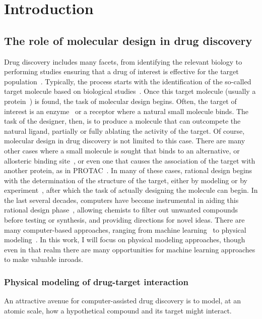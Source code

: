 \chapter{Introduction}
%
\section{The role of molecular design in drug discovery}
%
Drug discovery includes many facets, from identifying the relevant biology to performing studies ensuring that a drug of interest is effective for the target population~\cite{Paul2010}. 
%
Typically, the process starts with the identification of the so-called target molecule based on biological studies~\cite{Paul2010}.
%
Once this target molecule (usually a protein~\cite{Santos2016}) is found, the task of molecular design begins.
%
Often, the target of interest is an enzyme~\cite{Santos2016} or a receptor where a natural small molecule binds.
%
The task of the designer, then, is to produce a molecule that can outcompete the natural ligand, partially or fully ablating the activity of the target.
%
Of course, molecular design in drug discovery is not limited to this case.
%
There are many other cases where a small molecule is sought that binds to an alternative, or allosteric binding site~\cite{Lee2009,Nussinov2013}, or even one that causes the association of the target with another protein, as in PROTAC~\cite{Churcher2017, Tinworth2016}.
%
In many of these cases, rational design begins with the determination of the structure of the target, either by modeling or by experiment~\cite{Mandal2009}, after which the task of actually designing the molecule can begin.
%
In the last several decades, computers have become instrumental in aiding this rational design phase~\cite{Lu2018,Wang2015}, allowing chemists to filter out unwanted compounds before testing or synthesis, and providing directions for novel ideas.
%
There are many computer-based approaches, ranging from machine learning~\cite{Lo2018,Chen2018} to physical modeling~\cite{Michel2010, Swanson2004, qvist1994, Shirts2007}.
%
In this work, I will focus on physical modeling approaches, though even in that realm there are many opportunities for machine learning approaches to make valuable inroads.
%
\subsection{Physical modeling of drug-target interaction}
%
An attractive avenue for computer-assisted drug discovery is to model, at an atomic scale, how a hypothetical compound and its target might interact.
%
